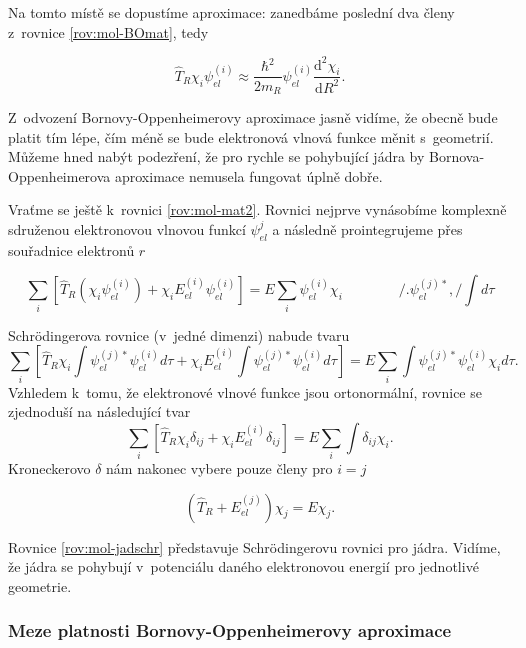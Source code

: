 \noindent Na tomto místě se dopustíme aproximace: zanedbáme poslední dva členy z~rovnice \ref{rov:mol-BOmat}, tedy
 
\begin{equation}
\hat{T}_R\chi_i\psi_{el}^{(i)}\approx\frac{\hbar^2}{2m_R}
\psi_{el}^{(i)}\frac{\mathrm{d}^2\chi_i}{\mathrm{d}R^2}.
\end{equation}

\noindent Z~odvození Bornovy-Oppenheimerovy aproximace jasně vidíme, že obecně bude platit tím lépe, čím méně se bude elektronová vlnová funkce měnit s~geometrií. Můžeme hned nabýt podezření, že pro rychle se pohybující jádra by Bornova-Oppenheimerova aproximace nemusela fungovat úplně dobře.

Vraťme se ještě k~rovnici \ref{rov:mol-mat2}. Rovnici nejprve vynásobíme komplexně sdruženou elektronovou vlnovou funkcí $\psi_{el}^{j}$ a následně prointegrujeme přes souřadnice elektronů $r$

\begin{equation}
\sum_i \left[\hat{T}_R(\chi_i\psi_{el}^{(i)}) + \chi_iE_{el}^{(i)}\psi_{el}^{(i)}\right]=E\sum_i \psi_{el}^{(i)}\chi_i \qquad \qquad /.\psi_{el}^{(j)*},/\int d\tau
\end{equation}


\noindent Schrödingerova rovnice (v~jedné dimenzi) nabude tvaru
\begin{equation}
\sum_i \left[\hat{T}_R\chi_i\int\psi_{el}^{(j)*}\psi_{el}^{(i)}d\tau + \chi_iE_{el}^{(i)}\int\psi_{el}^{(j)*}\psi_{el}^{(i)}d\tau\right]=E\sum_i \int \psi_{el}^{(j)*}\psi_{el}^{(i)}\chi_id\tau. 
\end{equation}
Vzhledem k~tomu, že elektronové vlnové funkce jsou ortonormální, rovnice se zjednoduší na následující tvar
\begin{equation}
\sum_i \left[\hat{T}_R\chi_i\delta_{ij} + \chi_iE_{el}^{(i)}\delta_{ij}\right]=E\sum_i \int \delta_{ij}\chi_i. 
\end{equation}
Kroneckerovo $\delta$ nám nakonec vybere pouze členy pro $i=j$

\begin{equation}
\boxed{\left(\hat{T}_R+E_{el}^{(j)}\right)\chi_j=E\chi_j.}
\label{rov:mol-jadschr}
\end{equation}

\noindent Rovnice \ref{rov:mol-jadschr} představuje Schrödingerovu rovnici pro jádra. Vidíme, že jádra se pohybují v~potenciálu daného elektronovou energií pro jednotlivé geometrie. 

\subsubsection{Meze platnosti Bornovy-Oppenheimerovy aproximace}

